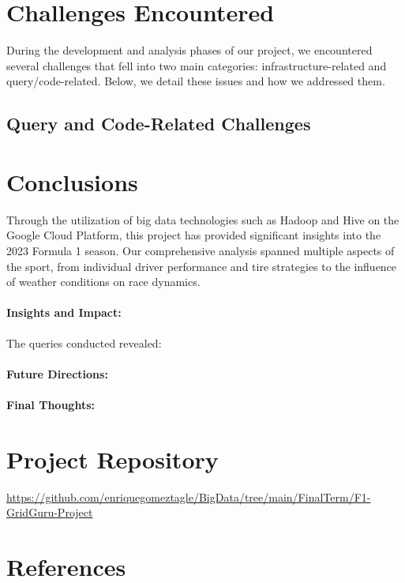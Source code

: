 \documentclass{article}
\begin{document}
\section{Challenges Encountered}
During the development and analysis phases of our project, we encountered several challenges that fell into two main categories: infrastructure-related and query/code-related. Below, we detail these issues and how we addressed them.

\subsection{Query and Code-Related Challenges}


\section{Conclusions}
Through the utilization of big data technologies such as Hadoop and Hive on the Google Cloud Platform, this project has provided significant insights into the 2023 Formula 1 season. Our comprehensive analysis spanned multiple aspects of the sport, from individual driver performance and tire strategies to the influence of weather conditions on race dynamics.

\paragraph{Insights and Impact:}
The queries conducted revealed:
\begin{itemize}
    
\end{itemize}


\paragraph{Future Directions:}


\paragraph{Final Thoughts:}




\section{Project Repository}
\url{https://github.com/enriquegomeztagle/BigData/tree/main/FinalTerm/F1-GridGuru-Project}

\section{References}
\label{sec:references}
\end{document}
